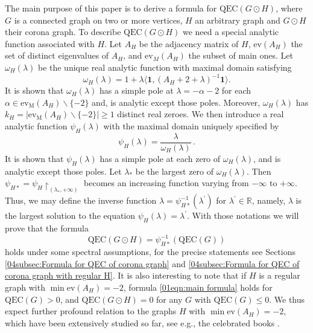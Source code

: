 \documentclass[12pt,a4paper]{article}
\newcommand{\1}{{\bm 1}}
\numberwithin{equation}{section}
\begin{document}
The main purpose of this paper is
to derive a formula for $\mathrm{QEC}(G\odot H)$,
where $G$ is a connected graph on two or more vertices,
$H$ an arbitrary graph and 
$G\odot H$ their corona graph.
To describe $\mathrm{QEC}(G\odot H)$ we need
a special analytic function associated with $H$.
Let $A_H$ be the adjacency matrix of $H$,
$\mathrm{ev}(A_H)$ the set of distinct eigenvalues of $A_H$,
and $\mathrm{ev}_M(A_H)$ the subset of main ones.
Let $\omega_H(\lambda)$ be the unique
real analytic function with maximal domain satisfying
%
\begin{equation}\label{01eqn:def of omega(lambda) for H}
\omega_H(\lambda)
= 1+\lambda \langle\mathbf{1},(A_H+2+\lambda)^{-1}\mathbf{1}\rangle.
\end{equation}
%
It is shown that $\omega_H(\lambda)$ has a simple pole
at $\lambda=-\alpha-2$ for each
$\alpha\in \mathrm{ev}_{\mathrm{M}}(A_H)\backslash\{-2\}$ and,
is analytic except those poles.
Moreover, $\omega_H(\lambda)$ has 
$k_H=|\mathrm{ev}_{\mathrm{M}}(A_H)\backslash\{-2\}|\ge1$
distinct real zeroes.
We then introduce
a real analytic function $\psi_H(\lambda)$ with 
the maximal domain uniquely specified by
%
\begin{equation}\label{01eqn:def of psi(lambda) for H}
\psi_H(\lambda)=\frac{\lambda}{\omega_H(\lambda)}\,.
\end{equation}
%
It is shown that $\psi_H(\lambda)$ has a simple pole
at each zero of $\omega_H(\lambda)$,
and is analytic except those poles.
Let $\lambda_*$ be the largest zero of $\omega_H(\lambda)$.
Then $\psi_{H*}=\psi_H\!\restriction_{(\lambda_*,+\infty)}$
becomes an increasing function varying from $-\infty$ to $+\infty$.
Thus, we may define the inverse function 
$\lambda=\psi_{H*}^{-1}(\lambda^\prime)$
for $\lambda^\prime\in\mathbb{R}$,
namely, $\lambda$ is the largest
solution to the equation $\psi_H(\lambda)=\lambda^\prime$.
With those notations we will prove that
the formula
%
\begin{equation}\label{01eqn:main formula}
\mathrm{QEC}(G\odot H)
=\psi_{H*}^{-1}(\mathrm{QEC}(G))
\end{equation}
%
holds under some spectral assumptions,
for the precise statements
see Sections \ref{04subsec:Formula for QEC of corona graph}
and \ref{04subsec:Formula for QEC of corona graph with regular H}.
It is also interesting to note that if $H$ is a regular graph
with $\min\mathrm{ev}(A_H)=-2$,
formula \eqref{01eqn:main formula} holds for $\mathrm{QEC}(G)>0$,
and $\mathrm{QEC}(G\odot H)=0$
for any $G$ with $\mathrm{QEC}(G)\le0$.
We thus expect further profound relation to the graphs $H$ with
$\min\mathrm{ev}(A_H)=-2$, which have been extensively studied so far,
see e.g., the celebrated books 
\cite{Brouwer-Cohen-Neumaier1989,
Cvetkovic-Rowlinson-Simic2004,Cvetkovic-Rowlinson-Simic2010}.
\end{document}
